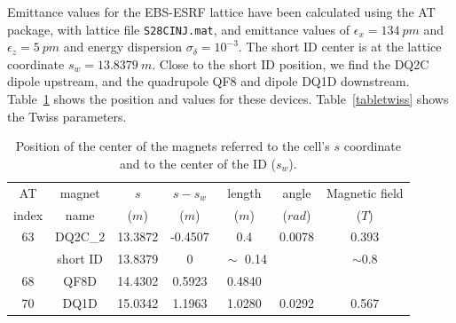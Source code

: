 \documentclass[a4paper,10pt]{article}
\begin{document}
Emittance values for the EBS-ESRF lattice have been calculated using the AT package, with lattice file {\tt S28CINJ.mat}, and emittance 
values of $\epsilon_x = 134~pm$ and $\epsilon_z = 5~pm$ and energy dispersion $\sigma_{\delta} = 10^{-3}$. The short ID center is at the lattice
coordinate $s_w = 13.8379~m$. Close to the short ID position, we find the DQ2C dipole upstream, and the quadrupole QF8 and dipole 
DQ1D downstream. Table~\ref{magnets} shows the position and values for these devices. Table~\ref{tabletwiss} shows the Twiss parameters.
% 
\begin{table}[H]
\label{magnets}
\caption{Position of the center of the magnets referred to the cell's $s$ coordinate and to the center of the ID ($s_w$).} 
\vspace{0.3cm}
\begin{tabular}{ccccccc}      %
\hline
AT       & magnet       & $s$     & $s-s_w$   &  length       & angle          & Magnetic field \\
index    & name         & ($m$)   & ($m$)     &  ($m$)        & ($rad$)        & ($T$)          \\
\hline
63       & DQ2C\_2      & 13.3872 & -0.4507   & 0.4           & 0.0078         &  0.393         \\
         & short ID     & 13.8379 & 0         & $~\sim$ 0.14  &                &  $\sim 0.8 $   \\
68       & QF8D         & 14.4302 & 0.5923    & 0.4840        &                &                \\
70       & DQ1D         & 15.0342 & 1.1963    & 1.0280        & 0.0292         &  0.567         \\
\hline
\end{tabular}
\end{table}
% 
% 
\end{document}

